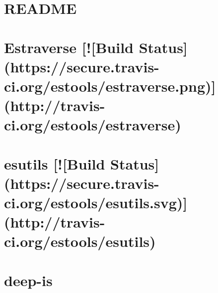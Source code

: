 \documentclass[twoside]{book}
\newcommand{\+}{\discretionary{\mbox{\scriptsize$\hookleftarrow$}}{}{}}
\begin{document}
\chapter{R\+E\+A\+D\+M\+E}
\label{md__c_1__users_martin__documents__git_hub_visual_studio__bachelor__wis_r__wis_r_node_modules_iste2ab884669bc72a7445c153fba365aee}
\hypertarget{md__c_1__users_martin__documents__git_hub_visual_studio__bachelor__wis_r__wis_r_node_modules_iste2ab884669bc72a7445c153fba365aee}{}

\chapter{Estraverse \mbox{[}!\mbox{[}Build Status\mbox{]}(https\+://secure.travis-\/ci.org/estools/estraverse.png)\mbox{]}(http\+://travis-\/ci.org/estools/estraverse)}
\label{md__c_1__users_martin__documents__git_hub_visual_studio__bachelor__wis_r__wis_r_node_modules_ist4b50d1b97dbaa5d77df5b13313e6e7d6}
\hypertarget{md__c_1__users_martin__documents__git_hub_visual_studio__bachelor__wis_r__wis_r_node_modules_ist4b50d1b97dbaa5d77df5b13313e6e7d6}{}

\chapter{esutils \mbox{[}!\mbox{[}Build Status\mbox{]}(https\+://secure.travis-\/ci.org/estools/esutils.svg)\mbox{]}(http\+://travis-\/ci.org/estools/esutils)}
\label{md__c_1__users_martin__documents__git_hub_visual_studio__bachelor__wis_r__wis_r_node_modules_istf6ceb1632f1db6e16378517a32bd723d}
\hypertarget{md__c_1__users_martin__documents__git_hub_visual_studio__bachelor__wis_r__wis_r_node_modules_istf6ceb1632f1db6e16378517a32bd723d}{}

\chapter{deep-\/is}
\label{md__c_1__users_martin__documents__git_hub_visual_studio__bachelor__wis_r__wis_r_node_modules_ist4008338c530281bf969d3f4344f06cbc}
\hypertarget{md__c_1__users_martin__documents__git_hub_visual_studio__bachelor__wis_r__wis_r_node_modules_ist4008338c530281bf969d3f4344f06cbc}{}

\end{document}
